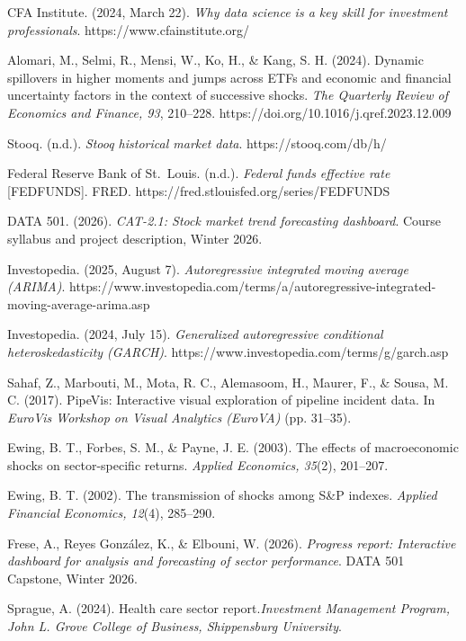 \documentclass[12pt]{article}
\begin{document}
\begin{thebibliography}{}

CFA Institute. (2024, March 22). \textit{Why data science is a key skill for investment professionals}. https://www.cfainstitute.org/

Alomari, M., Selmi, R., Mensi, W., Ko, H., \& Kang, S. H. (2024). Dynamic spillovers in higher moments and jumps across ETFs and economic and financial uncertainty factors in the context of successive shocks. \textit{The Quarterly Review of Economics and Finance, 93}, 210--228. https://doi.org/10.1016/j.qref.2023.12.009

Stooq. (n.d.). \textit{Stooq historical market data}. https://stooq.com/db/h/

Federal Reserve Bank of St.\ Louis. (n.d.). \textit{Federal funds effective rate} [FEDFUNDS]. FRED. https://fred.stlouisfed.org/series/FEDFUNDS

DATA 501. (2026). \textit{CAT-2.1: Stock market trend forecasting dashboard}. Course syllabus and project description, Winter 2026.

Investopedia. (2025, August 7). \textit{Autoregressive integrated moving average (ARIMA)}. https://www.investopedia.com/terms/a/autoregressive-integrated-moving-average-arima.asp

Investopedia. (2024, July 15). \textit{Generalized autoregressive conditional heteroskedasticity (GARCH)}. https://www.investopedia.com/terms/g/garch.asp


Sahaf, Z., Marbouti, M., Mota, R. C., Alemasoom, H., Maurer, F., \& Sousa, M. C. (2017). PipeVis: Interactive visual exploration of pipeline incident data. In \textit{EuroVis Workshop on Visual Analytics (EuroVA)} (pp. 31--35).

Ewing, B. T., Forbes, S. M., \& Payne, J. E. (2003). The effects of macroeconomic shocks on sector-specific returns. \textit{Applied Economics, 35}(2), 201--207.

Ewing, B. T. (2002). The transmission of shocks among S\&P indexes. \textit{Applied Financial Economics, 12}(4), 285--290.

Frese, A., Reyes González, K., \& Elbouni, W. (2026). \textit{Progress report: Interactive dashboard for analysis and forecasting of sector performance}. DATA 501 Capstone, Winter 2026.

Sprague, A. (2024).
Health care sector report.\textit{Investment Management Program, John L. Grove College of Business, Shippensburg University}.


\end{thebibliography}
\end{document}
